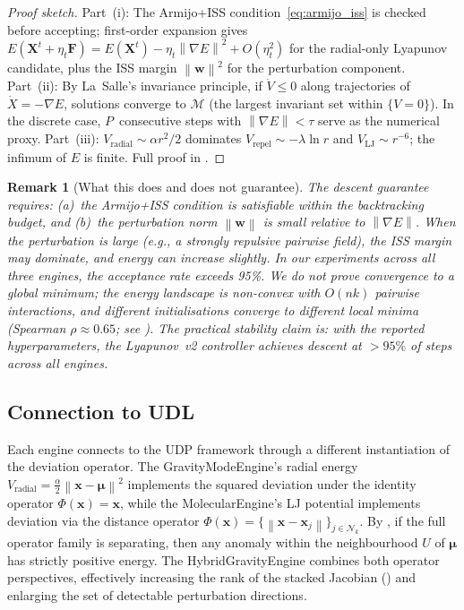 \documentclass{article}
\newtheorem{remark}[theorem]{Remark}
\newcommand{\norm}[1]{\left\lVert#1\right\rVert}
\begin{document}
\begin{proof}[Proof sketch]
Part~(i): The Armijo+ISS condition~\eqref{eq:armijo_iss} is checked before accepting; first-order expansion gives $E(\mathbf{X}^t + \eta_t \mathbf{F}) = E(\mathbf{X}^t) - \eta_t \norm{\nabla E}^2 + O(\eta_t^2)$ for the radial-only Lyapunov candidate, plus the ISS margin $\norm{\mathbf{w}}^2$ for the perturbation component. Part~(ii): By La~Salle's invariance principle, if $\dot{V} \leq 0$ along trajectories of $\dot{X} = -\nabla E$, solutions converge to $\mathcal{M}$ (the largest invariant set within $\{V = 0\}$). In the discrete case, $P$~consecutive steps with $\norm{\nabla E} < \tau$ serve as the numerical proxy. Part~(iii): $V_{\text{radial}} \sim \alpha r^2/2$ dominates $V_{\text{repel}} \sim -\lambda \ln r$ and $V_{\text{LJ}} \sim r^{-6}$; the infimum of $E$ is finite. Full proof in .
\end{proof}

\begin{remark}[What this does and does not guarantee]
\label{rem:convergence_scope}
The descent guarantee requires: (a)~the Armijo+ISS condition is satisfiable within the backtracking budget, and (b)~the perturbation norm $\norm{\mathbf{w}}$ is small relative to $\norm{\nabla E}$. When the perturbation is large (e.g., a strongly repulsive pairwise field), the ISS margin may dominate, and energy can increase slightly. In our experiments across all three engines, the acceptance rate exceeds 95\%. We do not prove convergence to a \emph{global} minimum; the energy landscape is non-convex with $O(nk)$ pairwise interactions, and different initialisations converge to different local minima (Spearman $\rho \approx 0.65$; see ). The practical stability claim is: with the reported hyperparameters, the Lyapunov~v2 controller achieves descent at $>95\%$ of steps across all engines.
\end{remark}

\subsection{Connection to UDL}

Each engine connects to the UDP framework through a different instantiation of the deviation operator. The GravityModeEngine's radial energy $V_{\text{radial}} = \frac{\alpha}{2}\norm{\mathbf{x} - \bm{\mu}}^2$ implements the squared deviation under the identity operator $\Phi(\mathbf{x}) = \mathbf{x}$, while the MolecularEngine's LJ potential implements deviation via the distance operator $\Phi(\mathbf{x}) = \{\norm{\mathbf{x} - \mathbf{x}_j}\}_{j \in \mathcal{N}_k}$. By , if the full operator family is separating, then any anomaly within the neighbourhood $U$ of $\bm{\mu}$ has strictly positive energy. The HybridGravityEngine combines both operator perspectives, effectively increasing the rank of the stacked Jacobian () and enlarging the set of detectable perturbation directions.
\end{document}
